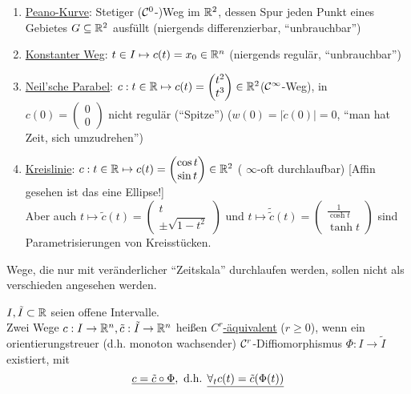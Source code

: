 \begin{bsp}\(\)
\begin{enumerate}
 \item \uline{Peano-Kurve}: Stetiger (\(\mathcal{C}^0\)-)Weg im \(\mathbb{R}^2\), dessen Spur jeden Punkt eines Gebietes \(G\subseteq \mathbb{R}^2\) ausfüllt (niergends differenzierbar, "`unbrauchbar"')
 \item \uline{Konstanter Weg}: \(t \in I \mapsto c(t)=x_0 \in \mathbb{R}^n\) (niergends regulär, "`unbrauchbar"')
 \item \uline{Neil'sche Parabel}: \(c: t\in \mathbb{R} \mapsto c(t) = \begin{pmatrix}
                                                                t^2 \\
								t^3
                                                               \end{pmatrix}
								\in \mathbb{R}^2 \)\quad (\(\mathcal{C}^\infty\)-Weg), in \(c(0)=\begin{pmatrix}
								                                                  0 \\
														  0
								                                                 \end{pmatrix} \) nicht regulär ("`Spitze"') (\(w(0)=|\dot c (0)|=0\), "`man hat Zeit, sich umzudrehen"')
 \item \uline{Kreislinie}: \(c: t\in \mathbb{R} \mapsto c(t)=\begin{pmatrix}
                                                       \cos t \\
						       \sin t
                                                      \end{pmatrix} \in \mathbb{R}^2\) ( \(\infty\)-oft durchlaufbar) [Affin gesehen ist das eine Ellipse!] \\
Aber auch \(t \mapsto \tilde c(t) = \begin{pmatrix}
                                     t \\
				     \pm \sqrt{1-t^2}
                                    \end{pmatrix} \) und \(t \mapsto \tilde{\tilde c}(t)=\begin{pmatrix}
											  \frac{1}{\cosh t} \\
											  \tanh t
											 \end{pmatrix} \)
sind Parametrisierungen von Kreisstücken.
\end{enumerate}
\end{bsp}
Wege,  die nur mit veränderlicher "`Zeitskala"' durchlaufen werden, sollen nicht als verschieden angesehen werden.
\begin{definition}
 \(I, \tilde I \subset \mathbb{R}\) seien offene Intervalle. \\
Zwei Wege \(c: I \to \mathbb{R}^n, \tilde c: \tilde I \to \mathbb{R}^n\) heißen \uline{\(C^r\)-äquivalent} (\(r\ge 0 \)), wenn ein orientierungstreuer (d.h. monoton wachsender) \(\mathcal{C}^r\)-Diffiomorphismus \(\Phi : I \to \tilde I\) existiert, mit
\[
 \uline{c= \tilde c \circ \Phi}, \text{ d.h. } \uline{\forall_t c(t)=\tilde c (\Phi(t))}
\]

\end{definition}

